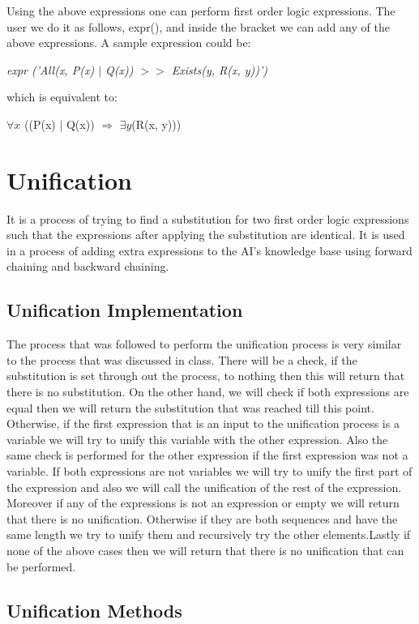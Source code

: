  Using the above expressions one can perform first order logic expressions. The
 user we do it as follows, expr(), and inside the bracket we can add any of the above expressions.
A sample expression could be:


\textit{expr ('All(x, P(x) $\mid$ Q(x)) $>$$>$ Exists(y, R(x, y))')}

which is equivalent to:

$\forall{x}$ ((P(x) $\mid$ Q(x)) $\Rightarrow$ $\exists{y}$(R(x, y)))

\section{Unification}
It is a process of trying to find a substitution for two first order logic
expressions such that the expressions after applying the substitution are
identical. It is used in a process of adding extra expressions to the AI's
knowledge base using forward chaining and backward chaining.

\subsection{Unification Implementation}\label{unificationMethod}
The process that was followed to perform the unification process is very similar to the process that was discussed in class. There will be a check, if the substitution is set through out the process, to nothing then this will return that there is no substitution. On the other hand, we will check if both expressions are equal then we will return the substitution that was reached till this point. Otherwise, if the first expression that is an input to the unification process is a variable we will try to unify this variable with the other expression. Also the same check is performed for the other expression if the first expression was not a variable. If both expressions are not variables we will try to unify the first part of the expression and also we will call the unification of the rest of the expression. Moreover if any of the expressions is not an expression or empty we will return that there is no unification. Otherwise if they are both sequences and have the same length we try to unify them and recursively try the other elements.Lastly if none of the above cases then we will return that there is no unification that can be performed.
\subsection{Unification Methods}
